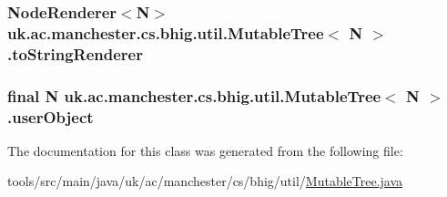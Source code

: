 \hypertarget{classuk_1_1ac_1_1manchester_1_1cs_1_1bhig_1_1util_1_1_mutable_tree_3_01_n_01_4_af6415ed590829a7d215abcc7fbda30c7}{
\subsubsection[{to\-String\-Renderer}]{\setlength{\rightskip}{0pt plus 5cm}Node\-Renderer$<$N$>$ uk.\-ac.\-manchester.\-cs.\-bhig.\-util.\-Mutable\-Tree$<$ N $>$.to\-String\-Renderer\hspace{0.3cm}{\ttfamily [private]}}}\label{classuk_1_1ac_1_1manchester_1_1cs_1_1bhig_1_1util_1_1_mutable_tree_3_01_n_01_4_af6415ed590829a7d215abcc7fbda30c7}
\hypertarget{classuk_1_1ac_1_1manchester_1_1cs_1_1bhig_1_1util_1_1_mutable_tree_3_01_n_01_4_aa8480fa5683b8058231a055ed85901c5}{
\subsubsection[{user\-Object}]{\setlength{\rightskip}{0pt plus 5cm}final N uk.\-ac.\-manchester.\-cs.\-bhig.\-util.\-Mutable\-Tree$<$ N $>$.user\-Object\hspace{0.3cm}{\ttfamily [private]}}}\label{classuk_1_1ac_1_1manchester_1_1cs_1_1bhig_1_1util_1_1_mutable_tree_3_01_n_01_4_aa8480fa5683b8058231a055ed85901c5}


The documentation for this class was generated from the following file\-:\begin{DoxyCompactItemize}
\item 
tools/src/main/java/uk/ac/manchester/cs/bhig/util/\hyperlink{_mutable_tree_8java}{Mutable\-Tree.\-java}\end{DoxyCompactItemize}
